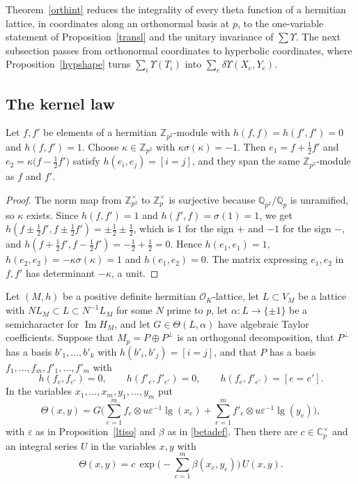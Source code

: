 Theorem~\ref{orthint} reduces the integrality of every theta function of a hermitian lattice, in coordinates along an orthonormal basis at $p$, to the one-variable statement of Proposition~\ref{transl} and the unitary invariance of $\sum\Upsilon$. The next subsection passes from orthonormal coordinates to hyperbolic coordinates, where Proposition~\ref{hypshape} turns $\sum_i\Upsilon(T_i)$ into $\sum_e\delta\Upsilon(X_e,Y_e)$.

\subsection{The kernel law}\label{sec:kernellaw}

\begin{lemma}\label{hypplane}
Let $f,f'$ be elements of a hermitian $\mathbb Z_{p^2}$-module with $h(f,f)=h(f',f')=0$ and $h(f,f')=1$. Choose $\kappa\in\mathbb Z_{p^2}$ with $\kappa\sigma(\kappa)=-1$. Then $e_1=f+\frac12f'$ and $e_2=\kappa\big(f-\frac12f'\big)$ satisfy $h(e_i,e_j)=[i=j]$, and they span the same $\mathbb Z_{p^2}$-module as $f$ and $f'$.
\end{lemma}

\begin{proof}
The norm map from $\mathbb Z_{p^2}^\times$ to $\mathbb Z_p^\times$ is surjective because $\mathbb Q_{p^2}/\mathbb Q_p$ is unramified, so $\kappa$ exists. Since $h(f,f')=1$ and $h(f',f)=\sigma(1)=1$, we get $h(f\pm\frac12f',f\pm\frac12f')=\pm\frac12\pm\frac12$, which is $1$ for the sign $+$ and $-1$ for the sign $-$, and $h(f+\frac12f',f-\frac12f')=-\frac12+\frac12=0$. Hence $h(e_1,e_1)=1$, $h(e_2,e_2)=-\kappa\sigma(\kappa)=1$ and $h(e_1,e_2)=0$. The matrix expressing $e_1,e_2$ in $f,f'$ has determinant $-\kappa$, a unit.
\end{proof}

\begin{theorem}\label{kernellaw}
Let $(M,h)$ be a positive definite hermitian $\mathcal O_K$-lattice, let $L\subset V_M$ be a lattice with $NL_M\subset L\subset N^{-1}L_M$ for some $N$ prime to $p$, let $\alpha\colon L\to\{\pm1\}$ be a semicharacter for $\operatorname{Im}H_M$, and let $G\in\Theta(L,\alpha)$ have algebraic Taylor coefficients. Suppose that $M_p=P\oplus P^\perp$ is an orthogonal decomposition, that $P^\perp$ has a basis $b'_1,\dots,b'_k$ with $h(b'_i,b'_j)=[i=j]$, and that $P$ has a basis $f_1,\dots,f_m,f'_1,\dots,f'_m$ with
\[
h(f_e,f_{e'})=0,\qquad h(f'_e,f'_{e'})=0,\qquad h(f_e,f'_{e'})=[e=e'].
\]
In the variables $x_1,\dots,x_m,y_1,\dots,y_m$ put
\[
\Theta(x,y)=G\Big(\sum_{e=1}^mf_e\otimes u\varepsilon^{-1}\operatorname{lg}(x_e)+\sum_{e=1}^mf'_e\otimes u\varepsilon^{-1}\operatorname{lg}(y_e)\Big),
\]
with $\varepsilon$ as in Proposition~\ref{ltiso} and $\beta$ as in \eqref{betadef}. Then there are $c\in\mathbb C_p^\times$ and an integral series $U$ in the variables $x,y$ with
\[
\Theta(x,y)=c\,\exp\Big(-\sum_{e=1}^m\beta(x_e,y_e)\Big)\,U(x,y).
\]
\end{theorem}

